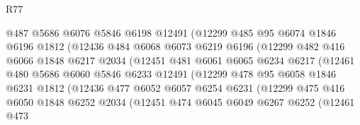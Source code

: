 \begin{lexlean}{R77}
\begin{coremodule}
                        @487
                        @5686
                        @6076
                        @5846
                        @6198
                        @12491
                        (@12299
                          @485
                          @95
                          @6074
                          @1846
                          @6196
                          @1812
                          (@12436
                            @484
                            @6068
                            @6073
                            @6219
                            @6196
                            (@12299
                              @482
                              @416
                              @6066
                              @1848
                              @6217
                              @2034
                              (@12451
                                @481
                                @6061
                                @6065
                                @6234
                                @6217
                                (@12461
                                  @480
                                  @5686
                                  @6060
                                  @5846
                                  @6233
                                  @12491
                                  (@12299
                                    @478
                                    @95
                                    @6058
                                    @1846
                                    @6231
                                    @1812
                                    (@12436
                                      @477
                                      @6052
                                      @6057
                                      @6254
                                      @6231
                                      (@12299
                                        @475
                                        @416
                                        @6050
                                        @1848
                                        @6252
                                        @2034
                                        (@12451
                                          @474
                                          @6045
                                          @6049
                                          @6267
                                          @6252
                                          (@12461
                                            @473

\end{coremodule}
\end{lexlean}
